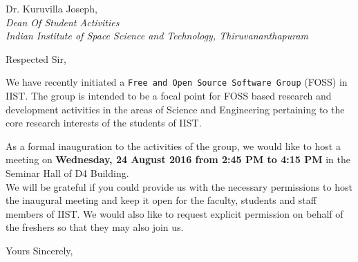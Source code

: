 \documentclass[a4paper,final]{letter}
\begin{document}
\begin{letter}{Dr. Kuruvilla Joseph,\\
    \emph{Dean Of Student Activities} \\
    \emph{Indian Institute of Space Science and Technology, Thiruvananthapuram}}
  
\opening{Respected Sir,}
We have recently initiated a \texttt{Free and Open Source Software
  Group} (FOSS) in IIST. The group is intended to be a focal point for
FOSS based research and development activities in the areas of Science
and Engineering pertaining to the core research interests of the
students of IIST.

As a formal inauguration to the activities of the group, we would like
to host a meeting on \textbf{Wednesday, 24 August 2016 from 2:45 PM to
  4:15 PM} in the Seminar Hall of D4 Building. \\
We will be grateful if you could provide us with the necessary
permissions to host the inaugural meeting and keep it open for the
faculty, students and staff members of IIST. We would also like to
request explicit permission on behalf of the freshers so that they may
also join us.

\closing{Yours Sincerely,}

\end{letter}
\end{document}
